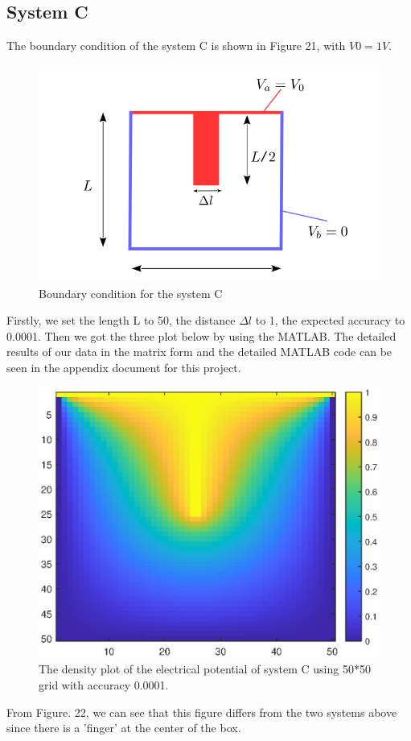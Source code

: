 \documentclass[12pt]{report}
\begin{document}
\subsection{System C}
The boundary condition of the system C is shown in Figure 21, with $V0=1V$.
\begin{figure}[H]
    \centering
    \includegraphics[width=0.8\linewidth]{5.png}
    \caption{Boundary condition for the system C}
    \label{fig:my_label}
\end{figure}
Firstly, we set the length L to 50, the distance $\Delta l$ to 1, the expected accuracy to 0.0001. Then we got the three plot below by using the MATLAB. The detailed results of our data in the matrix form and the detailed MATLAB code can be seen in the appendix document for this project. 
\begin{figure}[H]
    \centering
    \includegraphics[width=0.8\linewidth]{C00001Density.eps}
    \caption{The density plot of the electrical potential of system C using 50*50 grid with accuracy 0.0001.}
\end{figure}
From Figure. 22, we can see that this figure differs from the two systems above since there is a 'finger' at the center of the box.
\end{document}
